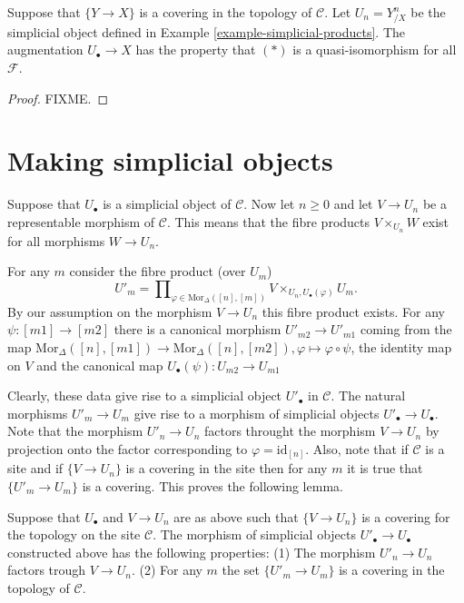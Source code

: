 \begin{lemma}
\label{lemma-product-hypercovering}
Suppose that $\{Y \to X\}$ is a covering in the topology of
$\mathcal{C}$. Let $U_n = Y^n_{/X}$ be the simplicial
object defined in Example \ref{example-simplicial-products}.
The augmentation $U_\bullet \to X$ has the property
that $(*)$ is a quasi-isomorphism for all $\mathcal{F}$.
\end{lemma}

\begin{proof}
FIXME.
\end{proof}

\section{Making simplicial objects}
\label{section-making-simplicial}

\noindent
Suppose that $U_\bullet$ is a simplicial object of $\mathcal{C}$. Now let
$n\geq 0$ and let $V \to U_n$ be a representable morphism of 
$\mathcal{C}$. This means that the fibre products $V \times_{U_n} W$ 
exist for all morphisms $W \to U_n$.

\medskip\noindent
For any $m$ consider the fibre product (over $U_m$)
$$
U'_m = \prod\nolimits_{\varphi \in \text{Mor}_\Delta([n],[m])}
V\times_{U_n, U_\bullet(\varphi)} U_m.
$$
By our assumption on the morphism $V \to U_n$ this fibre product
exists. For any $\psi : [m1] \to [m2]$ there is a canonical morphism
$U'_{m2} \to U'_{m1}$ coming from the map $\text{Mor}_\Delta([n],[m1])
\to \text{Mor}_\Delta([n],[m2]), \varphi \mapsto \varphi \circ \psi$,
the identity map on $V$ and the canonical map $U_\bullet(\psi) : 
U_{m2} \to U_{m1}$

\medskip\noindent
Clearly, these data give rise to a simplicial object $U'_\bullet$ in
$\mathcal{C}$. The natural morphisms $U'_m \to U_m$ give rise to a
morphism of simplicial objects $U'_\bullet \to U_\bullet$. Note that
the morphism $U'_n \to U_n$ factors throught the morphism $V \to U_n$
by projection onto the factor corresponding to $\varphi=\text{id}_{[n]}$.
Also, note that if $\mathcal{C}$ is a site and if 
$\{V \to U_n\}$ is a covering in the site then for any $m$ it is true
that $\{U'_m \to U_m\}$ is a covering. This proves the following lemma.

\begin{lemma}
\label{lemma-construct-new-covers}
Suppose that $U_\bullet$ and $V\to U_n$ are as above such that
$\{V \to U_n\}$ is a covering for the topology on the site
$\mathcal{C}$. The morphism of simplicial objects 
$U'_\bullet \to U_\bullet$ constructed above has the following 
properties:
(1) The morphism $U'_n \to U_n$ factors trough $V \to U_n$.
(2) For any $m$ the set $\{U'_m \to U_m\}$ is a covering
in the topology of $\mathcal{C}$.
\end{lemma}

